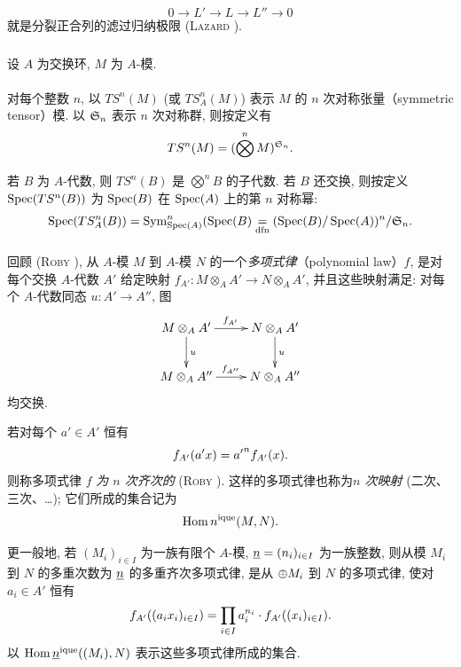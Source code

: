 $$
0\longrightarrow L'\longrightarrow L\longrightarrow L''\longrightarrow
0
$$
就是分裂正合列的滤过归纳极限 (\textsc{Lazard} \cite[I 2.3]{sga4.exp.XVII.bib.La}).

\subsubsection{}
设 $A$ 为交换环, $M$ 为 $A$-模.

\paragraph{}
对每个整数 $n$, 以 $TS^{n}(M)$ (或 $TS^{n}_A(M)$) 表示 $M$ 的 $n$ 次对称张量（symmetric tensor）模. 以 $\mathfrak{S}_n$ 表示 $n$ 次对称群, 则按定义有
$$
TS^{n}(M)=(\bigotimes^{n}M)^{\mathfrak{S}_n}{}.
$$

若 $B$ 为 $A$-代数, 则 $TS^{n}(B)$ 是 $\bigotimes\limits^{n}B$ 的子代数. 若 $B$ 还交换, 则按定义 $\operatorname{Spec} (TS^{n}(B))$ 为 $\operatorname{Spec}(B)$ 在 $\operatorname{Spec}(A)$ 上的第 $n$ 对称幂:
$$
\operatorname{Spec}(TS^{n}_{A}(B))=\operatorname{Sym}^{n}_{\operatorname{Spec}(A)}(\operatorname{Spec}(B)\underset{\operatorname{dfn}}{=}(\operatorname{Spec}(B)/\operatorname{Spec}(A))^{n}/\mathfrak{S}_n{}.
$$

\paragraph{}
回顾 (\textsc{Roby} \cite[I ]{sga4.exp.XVII.bib.Ro}), 从 $A$-模 $M$ 到 $A$-模 $N$ 的一个\emph{多项式律}（polynomial law）$f$, 是对每个交换 $A$-代数 $A'$ 给定映射 $f_{A'}:M\otimes_{A}A'\rightarrow N\otimes_{A}A'$, 并且这些映射满足: 对每个 $A$-代数同态 $u:A'\rightarrow A''$, 图
\[
\xymatrix{
M \otimes_A A'  \ar[r]^{f_{A'}} \ar[d]^{u}& N \otimes_A A' \ar[d]^{u}\\
M \otimes_A A'' \ar[r]^{f_{A''}}& N \otimes_A A''
}
\]
均\pageoriginale 交换.

若对每个 $a'\in A'$ 恒有
\[
f_{A'}(a'x)={a'}^{n}f_{A'}(x){}.
\]
则称多项式律 $f$ \emph{为 $n$ 次齐次的} (\textsc{Roby} \cite[I  p.~226]{sga4.exp.XVII.bib.Ro}). 这样的多项式律也称为\emph{$n$ 次映射} (二次、三次、\ldots); 它们所成的集合记为
\[
\operatorname{Hom} n^{\text{\rm ique}} (M,N){}.
\]

更一般地, 若 $(M_{i})_{i\in I}$ 为一族有限个 $A$-模, $\underline{n} =(n_{i})_{i\in I}$ 为一族整数, 则从模 $M_{i}$ 到 $N$ 的多重次数为 $\underline{n} $ 的多重齐次多项式律, 是从 $\oplus M_{i}$ 到 $N$ 的多项式律, 使对 $a_{i}\in A'$ 恒有
\[
f_{A'}((a_{i}x_{i})_{i\in I})=\prod_{i\in I} a^{n_{i}}_i\cdot
f_{A'}((x_{i})_{i\in I}){}.
\]
以 $\operatorname{Hom} \underline{n} ^{\text{\rm ique}}((M_{i}),N)$ 表示这些多项式律所成的集合.

